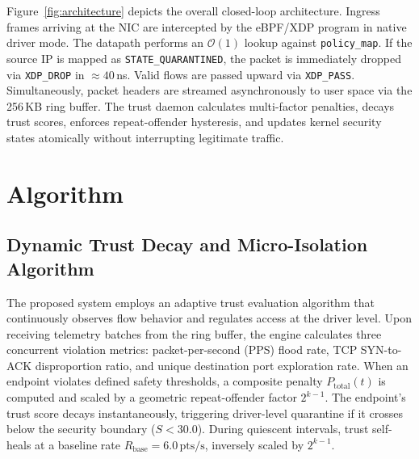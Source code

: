 \documentclass[conference]{IEEEtran}
\begin{document}
Figure~\ref{fig:architecture} depicts the overall closed-loop architecture. Ingress frames arriving at the NIC are intercepted by the eBPF/XDP program in native driver mode. The datapath performs an $\mathcal{O}(1)$ lookup against \texttt{policy\_map}. If the source IP is mapped as \texttt{STATE\_QUARANTINED}, the packet is immediately dropped via \texttt{XDP\_DROP} in $\approx 40$\,ns. Valid flows are passed upward via \texttt{XDP\_PASS}. Simultaneously, packet headers are streamed asynchronously to user space via the 256\,KB ring buffer. The trust daemon calculates multi-factor penalties, decays trust scores, enforces repeat-offender hysteresis, and updates kernel security states atomically without interrupting legitimate traffic.

\section{Algorithm}

\subsection{Dynamic Trust Decay and Micro-Isolation Algorithm}
The proposed system employs an adaptive trust evaluation algorithm that continuously observes flow behavior and regulates access at the driver level. Upon receiving telemetry batches from the ring buffer, the engine calculates three concurrent violation metrics: packet-per-second (PPS) flood rate, TCP SYN-to-ACK disproportion ratio, and unique destination port exploration rate. When an endpoint violates defined safety thresholds, a composite penalty $P_{\text{total}}(t)$ is computed and scaled by a geometric repeat-offender factor $2^{k-1}$. The endpoint's trust score decays instantaneously, triggering driver-level quarantine if it crosses below the security boundary ($S < 30.0$). During quiescent intervals, trust self-heals at a baseline rate $R_{\text{base}} = 6.0\,\text{pts/s}$, inversely scaled by $2^{k-1}$.
\end{document}
